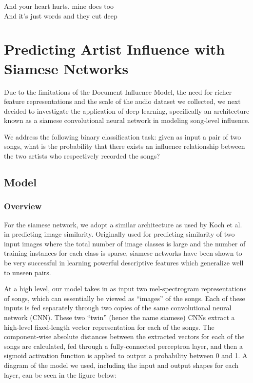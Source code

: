 \begin{savequote}[75mm] 
And your heart hurts, mine does too\\
And it's just words and they cut deep
\end{savequote}

\chapter{Predicting Artist Influence with Siamese Networks}
Due to the limitations of the Document Influence Model, the need for richer feature representations and the scale of the audio dataset we collected, we next decided to investigate the application of deep learning, specifically an architecture known as a siamese convolutional neural network in modeling song-level influence. 

We address the following binary classification task: given as input a pair of two songs, what is the probability that there exists an influence relationship between the two artists who respectively recorded the songs?

\section{Model}
\subsection{Overview}
For the siamese network, we adopt a similar architecture as used by Koch et al. \cite{koch2015siamese} in predicting image similarity. Originally used for predicting similarity of two input images where the total number of image classes is large and the number of training instances for each class is sparse, siamese networks have been shown to be very successful in learning powerful descriptive features which generalize well to unseen pairs.

At a high level, our model takes in as input two mel-spectrogram representations of songs, which can essentially be viewed as ``images'' of the songs. Each of these inputs is fed separately through two copies of the same convolutional neural network (CNN). These two ``twin'' (hence the name siamese) CNNs extract a high-level fixed-length vector representation for each of the songs. The component-wise absolute distances between the extracted vectors for each of the songs are calculated, fed through a fully-connected perceptron layer, and then a sigmoid activation function is applied to output a probability between 0 and 1. A diagram of the model we used, including the input and output shapes for each layer, can be seen in the figure below:

